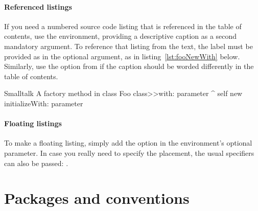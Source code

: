 \documentclass[twoside,openany,showtrims]{sbabook}
\begin{document}
\paragraph{Referenced listings}
If you need a numbered source code listing that is referenced in the table of
contents, use the  environment, providing a descriptive caption as
a second mandatory argument.
To reference that listing from the text, the label must be provided as
 in the optional argument, as in
listing~\ref{lst:fooNewWith} below.
Similarly, use the  option from  if the caption
should be worded differently in the table of contents.

\begin{listing}[label=lst:fooNewWith]{Smalltalk}
{A factory method in class }
Foo class>>with: parameter
  ^ self new
    initializeWith: parameter
\end{listing}


\paragraph{Floating listings}
To make a floating listing, simply add the  option in the
environment's optional parameter.
In case you really need to specify the placement, the usual specifiers can also
be passed: .


\section{Packages and conventions}



\clearpage
\end{document}

